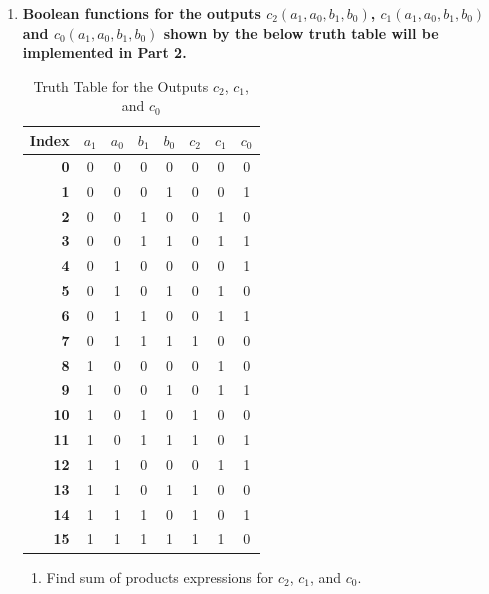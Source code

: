 \documentclass[table]{article}
\begin{document}
\begin{enumerate}[label=\textbf{\arabic*.}]
\begin{enumerate}[label=\textbf{\alph*.}]
    \end{enumerate}

    \item \textbf{Boolean functions for the outputs \(c_2(a_1,a_0,b_1,b_0)\), \(c_1(a_1,a_0,b_1,b_0)\) and \(c_0(a_1,a_0,b_1,b_0)\) shown by the below truth table will be implemented in Part 2. } 
    
    \begin{table}[h!]
        \centering
       \caption{Truth Table for the Outputs \(c_2\), \(c_1\), and \(c_0\)}
       \label{tab:truth-given}
       \begin{tabular}{|r|c|c|c|c||c|c|c|}
       \hline
       \textbf{Index} & $a_1$ & $a_0$ & $b_1$ & $b_0$ & $c_2$ & $c_1$ & $c_0$ \\
       \hline
       \textbf{0} & 0 & 0 & 0 & 0 & 0 & 0 & 0 \\
       \textbf{1} & 0 & 0 & 0 & 1 & 0 & 0 & 1 \\
       \textbf{2} & 0 & 0 & 1 & 0 & 0 & 1 & 0 \\
       \textbf{3} & 0 & 0 & 1 & 1 & 0 & 1 & 1 \\
       \textbf{4} & 0 & 1 & 0 & 0 & 0 & 0 & 1 \\
       \textbf{5} & 0 & 1 & 0 & 1 & 0 & 1 & 0 \\
       \textbf{6} & 0 & 1 & 1 & 0 & 0 & 1 & 1 \\
       \textbf{7} & 0 & 1 & 1 & 1 & 1 & 0 & 0 \\
       \textbf{8} & 1 & 0 & 0 & 0 & 0 & 1 & 0 \\
       \textbf{9} & 1 & 0 & 0 & 1 & 0 & 1 & 1 \\
       \textbf{10} & 1 & 0 & 1 & 0 & 1 & 0 & 0 \\
       \textbf{11} & 1 & 0 & 1 & 1 & 1 & 0 & 1 \\
       \textbf{12} & 1 & 1 & 0 & 0 & 0 & 1 & 1 \\
       \textbf{13} & 1 & 1 & 0 & 1 & 1 & 0 & 0 \\
       \textbf{14} & 1 & 1 & 1 & 0 & 1 & 0 & 1 \\
       \textbf{15} & 1 & 1 & 1 & 1 & 1 & 1 & 0 \\
       \hline
       \end{tabular}
       \end{table}



    \begin{enumerate}[label=\textbf{\alph*.}]
        \item Find sum of products expressions for \(c_2\), \(c_1\), and \(c_0\). \\
        

\end{enumerate}
\end{enumerate}
\end{document}
